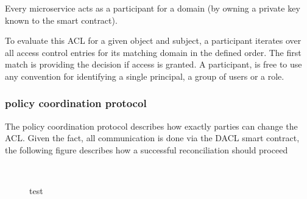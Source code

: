 \documentclass[12pt, conference]{IEEEtran}
\begin{document}
Every microservice acts as a participant for a domain (by owning a private key known to the smart contract). 

To evaluate this ACL for a given object and subject, a participant iterates over all access control entries for its matching domain in the defined order. The first match is providing the decision if access is granted. A participant, is free to use any convention for identifying a single principal, a group of users or a role. 


\subsubsection{policy coordination protocol}

The policy coordination protocol describes how exactly parties can change the ACL. Given the fact, all communication is done via the DACL smart contract, the following figure describes how a successful reconciliation should proceed 

\begin{figure}[!h]
\centering
{} \hfill
{} \hfill
{} \\
\caption{test}
\end{figure}
\end{document}
